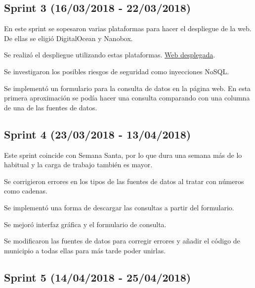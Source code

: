 

\subsection{Sprint 3 (16/03/2018 - 22/03/2018)}

En este sprint se sopesaron varias plataformas para hacer el despliegue de la web. De ellas se eligió DigitalOcean y Nanobox.

Se realizó el despliegue utilizando estas plataformas. \href{http://tfg-datos-publicos.nanoapp.io/}{Web desplegada}.

Se investigaron los posibles riesgos de seguridad como inyecciones NoSQL.

Se implementó un formulario para la consulta de datos en la página web. En esta primera aproximación se podía hacer una consulta comparando con una columna de una de las fuentes de datos.



\subsection{Sprint 4 (23/03/2018 - 13/04/2018)}

Este sprint coincide con Semana Santa, por lo que dura una semana más de lo habitual y la carga de trabajo también es mayor.

Se corrigieron errores en los tipos de las fuentes de datos al tratar con números como cadenas. 

Se implementó una forma de descargar las consultas a partir del formulario. 

Se mejoró interfaz gráfica y el formulario de consulta.

Se modificaron las fuentes de datos para corregir errores y añadir el código de municipio a todas ellas para más tarde poder unirlas.



\subsection{Sprint 5 (14/04/2018 - 25/04/2018)}

